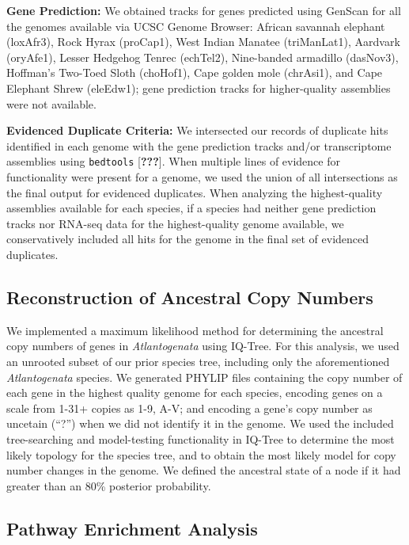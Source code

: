 \documentclass[10pt,letterpaper]{article}
\begin{document}
\textbf{Gene Prediction:} We obtained tracks for genes predicted using
GenScan for all the genomes available via UCSC Genome Browser: African
savannah elephant (loxAfr3), Rock Hyrax (proCap1), West Indian Manatee
(triManLat1), Aardvark (oryAfe1), Lesser Hedgehog Tenrec (echTel2),
Nine-banded armadillo (dasNov3), Hoffman's Two-Toed Sloth (choHof1),
Cape golden mole (chrAsi1), and Cape Elephant Shrew (eleEdw1); gene
prediction tracks for higher-quality assemblies were not available.

\textbf{Evidenced Duplicate Criteria:} We intersected our records of
duplicate hits identified in each genome with the gene prediction tracks
and/or transcriptome assemblies using \texttt{bedtools}
{[}{\textbf{???}}{]}. When multiple lines of evidence for functionality
were present for a genome, we used the union of all intersections as the
final output for evidenced duplicates. When analyzing the
highest-quality assemblies available for each species, if a species had
neither gene prediction tracks nor RNA-seq data for the highest-quality
genome available, we conservatively included all hits for the genome in
the final set of evidenced duplicates.

\hypertarget{reconstruction-of-ancestral-copy-numbers}{%
\subsection{Reconstruction of Ancestral Copy
Numbers}\label{reconstruction-of-ancestral-copy-numbers}}

We implemented a maximum likelihood method for determining the ancestral
copy numbers of genes in \emph{Atlantogenata} using IQ-Tree. For this
analysis, we used an unrooted subset of our prior species tree,
including only the aforementioned \emph{Atlantogenata} species. We
generated PHYLIP files containing the copy number of each gene in the
highest quality genome for each species, encoding genes on a scale from
1-31+ copies as 1-9, A-V; and encoding a gene's copy number as uncetain
(``?'') when we did not identify it in the genome. We used the included
tree-searching and model-testing functionality in IQ-Tree to determine
the most likely topology for the species tree, and to obtain the most
likely model for copy number changes in the genome. We defined the
ancestral state of a node if it had greater than an 80\% posterior
probability.

\hypertarget{pathway-enrichment-analysis}{%
\subsection{Pathway Enrichment
Analysis}\label{pathway-enrichment-analysis}}
\end{document}
